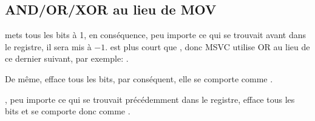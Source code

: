 \subsection{AND/OR/XOR au lieu de MOV}

 mets tous les bits à 1, en conséquence, peu importe ce qui
se trouvait avant dans le registre, il sera mis à $-1$.
 est plus court que , donc MSVC utilise OR au lieu
de ce dernier suivant, par exemple: .

De même,  efface tous les bits, par conséquent, elle se comporte
comme .

, peu importe ce qui se trouvait précédemment dans le registre,
efface tous les bits et se comporte donc comme .

